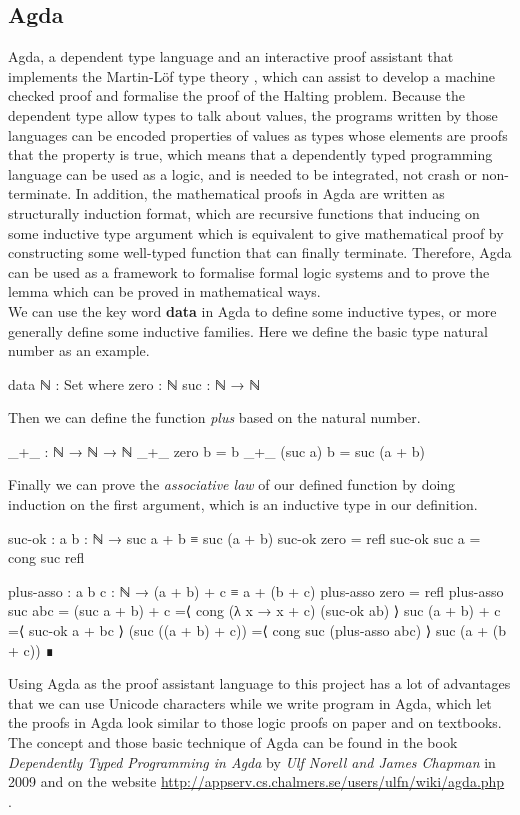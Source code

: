 \documentclass{jfrarticle}
\begin{document}
\subsection{Agda}
Agda, a dependent type language and an interactive proof assistant that
implements the Martin-Löf type theory \cite{van_oosten_homotopy_2014}, which can assist to develop a machine checked proof and formalise the proof of the Halting problem. 
Because the dependent type allow types to talk about values, the programs written by those languages can be encoded properties of values as types whose elements are proofs that the
property is true, which means that a dependently typed programming language can be used as a logic, and is needed to be integrated, not crash or non-terminate.
In addition, the mathematical proofs in Agda are written as structurally induction format, which are recursive functions that inducing on some inductive type argument which is equivalent to give mathematical proof by constructing some well-typed function that can finally terminate.
Therefore, Agda can be used as a framework to formalise formal logic systems and to prove the lemma which can be proved in mathematical ways.\\
We can use the key word \textbf{data} in Agda to define some inductive types, or more generally define some inductive families.
Here we define the basic type natural number as an example.
\begin{code}[fontsize=\small]
data ℕ : Set where
  zero : ℕ
  suc  : ℕ → ℕ
\end{code}
Then we can define the function \textit{plus} based on the natural number.
\begin{code}[fontsize=\small]
_+_ : ℕ → ℕ → ℕ
_+_ zero b = b
_+_ (suc a) b = suc (a + b)
\end{code}
Finally we can prove the \textit{associative	law} of our defined function by doing induction on the first argument, which is an inductive type in our definition.
\begin{code}[fontsize=\footnotesize]
suc-ok :  {a b : ℕ} → suc a + b ≡ suc (a + b)
suc-ok {zero} = refl
suc-ok {suc a} = cong suc refl

plus-asso : {a b c : ℕ} → (a + b) + c ≡ a + (b + c)
plus-asso {zero} = refl
plus-asso {suc a}{b}{c} = (suc a + b) + c
                        =⟨ cong (λ x → x + c) (suc-ok {a}{b}) ⟩
                        suc (a + b) + c
                        =⟨ suc-ok {a + b}{c} ⟩
                        (suc ((a + b) + c))
                        =⟨ cong suc (plus-asso {a}{b}{c}) ⟩
                        suc (a + (b + c))
                        ∎
\end{code}
Using Agda as the proof assistant language to this project has a lot of advantages that we can use Unicode characters while we write program in Agda, which let the proofs in Agda look similar to those logic proofs on paper and on textbooks.\\
The concept and those basic technique of Agda can be found in the book \textit{Dependently Typed Programming in Agda} by \textit{Ulf Norell and James Chapman} in 2009 \cite{norell_dependently_2009} and on the website \url{http://appserv.cs.chalmers.se/users/ulfn/wiki/agda.php} \cite{agda}.
\end{document}
